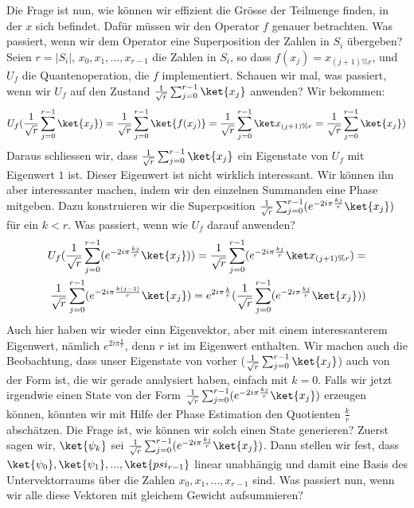 Die Frage ist nun, wie können wir effizient die Grösse der Teilmenge finden, in der $x$ sich befindet. Dafür müssen wir den Operator $f$ genauer betrachten. Was passiert, wenn wir dem Operator eine Superposition der Zahlen in $S_i$ übergeben? Seien $r = |S_i|$, $x_0, x_1, ..., x_{r - 1}$ die Zahlen in $S_i$, so dass $f(x_j) = x_{(j + 1) \% r}$, und $U_f$ die Quantenoperation, die $f$ implementiert. Schauen wir mal, was passiert, wenn wir $U_f$ auf den Zustand $\frac{1}{\sqrt{r}}\sum_{j = 0}^{r - 1}\ket{x_j}$ anwenden? Wir bekommen:
\begin{align*}
    U_f(\frac{1}{\sqrt{r}}\sum_{j = 0}^{r - 1}\ket{x_j}) = \frac{1}{\sqrt{r}}\sum_{j = 0}^{r - 1}\ket{f(x_j)} = \frac{1}{\sqrt{r}}\sum_{j = 0}^{r - 1}\ket{x_{(j + 1) \% r}} = \frac{1}{\sqrt{r}}\sum_{j = 0}^{r - 1}\ket{x_j})
\end{align*}
Daraus schliessen wir, dass $\frac{1}{\sqrt{r}}\sum_{j = 0}^{r - 1}\ket{x_j}$ ein Eigenstate von $U_f$ mit Eigenwert $1$ ist. Dieser Eigenwert ist nicht wirklich interessant. Wir können ihn aber interessanter machen, indem wir den einzelnen Summanden eine Phase mitgeben. Dazu konstruieren wir die Superposition $\frac{1}{\sqrt{r}}\sum_{j = 0}^{r - 1}(e^{-2i\pi\frac{kj}{r}}\ket{x_j})$ für ein $k < r$. Was passiert, wenn wie $U_f$ darauf anwenden? 
\begin{align*}
    U_f(\frac{1}{\sqrt{r}}\sum_{j = 0}^{r - 1}(e^{-2i\pi\frac{kj}{r}}\ket{x_j})) = \frac{1}{\sqrt{r}}\sum_{j = 0}^{r - 1}(e^{-2i\pi\frac{kj}{r}}\ket{x_{(j + 1) \% r}}) = \\
    \frac{1}{\sqrt{r}}\sum_{j = 0}^{r - 1}(e^{-2i\pi\frac{k(j - 1)}{r}}\ket{x_j}) = e^{2i\pi\frac{k}{r}}(\frac{1}{\sqrt{r}}\sum_{j = 0}^{r - 1}(e^{-2i\pi\frac{kj}{r}}\ket{x_j}))
\end{align*}
Auch hier haben wir wieder einn Eigenvektor, aber mit einem interessanterem Eigenwert, nämlich $e^{2i\pi\frac{k}{r}}$, denn $r$ ist im Eigenwert enthalten. Wir machen auch die Beobachtung, dass unser Eigenstate von vorher ($\frac{1}{\sqrt{r}}\sum_{j = 0}^{r - 1}\ket{x_j}$) auch von der Form ist, die wir gerade analysiert haben, einfach mit $k = 0$. Falls wir jetzt irgendwie einen State von der Form $\frac{1}{\sqrt{r}}\sum_{j = 0}^{r - 1}(e^{-2i\pi\frac{kj}{r}}\ket{x_j})$ erzeugen können, könnten wir mit Hilfe der Phase Estimation den Quotienten $\frac{k}{r}$ abschätzen. Die Frage ist, wie können wir solch einen State generieren? Zuerst sagen wir, $\ket{\psi_k}$ sei $\frac{1}{\sqrt{r}}\sum_{j = 0}^{r - 1}(e^{-2i\pi\frac{kj}{r}}\ket{x_j})$. Dann stellen wir fest, dass $\ket{\psi_0}, \ket{\psi_1}, ..., \ket{psi_{r - 1}}$ linear unabhängig und damit eine Basis des Untervektorraums über die Zahlen $x_0, x_1, ..., x_{r - 1}$ sind. Was passiert nun, wenn wir alle diese Vektoren mit gleichem Gewicht aufsummieren?
